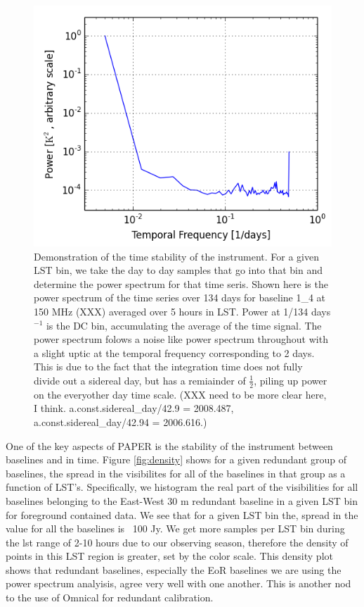 \documentclass[twocolumn,numberedappendix]{emulateapj} \shorttitle{PSA64}
\begin{document}
\begin{figure}[!t]
\centering
\includegraphics[width=\columnwidth]{plots/stability.png}
\caption{Demonstration of the time stability of the instrument. For a given LST
bin, we take the day to day samples that go into that bin and determine the
power spectrum for that time seris. Shown here is the power spectrum of the time
series over 134 days for baseline 1\_4 at 150 MHz (XXX) averaged over 5 hours in
LST. Power at 1/134 days$^{-1}$ is the DC bin, accumulating the average of the
time signal. The power spectrum folows a noise like power spectrum throughout
with a slight uptic at the temporal frequency corresponding to 2 days. This is
due to the fact that the integration time does not fully divide out a sidereal
day, but has a remiainder of $\frac{1}{2}$, piling up power on the everyother day
time scale. (XXX need to be more clear here, I think. a.const.sidereal\_day/42.9
= 2008.487, a.const.sidereal\_day/42.94 = 2006.616.)
}
\label{fig:stability}
\end{figure}


One of the key aspects of PAPER is the stability of the instrument between
baselines and in time. Figure \ref{fig:density} shows for a given redundant
group of baselines, the spread in the visibilites for all of the baselines in
that group as a function of LST's. Specifically, we histogram the real part of
the visibilities for all baselines belonging to the East-West 30 m redundant
baseline in a given LST bin for foreground contained data. We see that for a
given LST bin the, spread in the value for all the baselines is ~100 Jy.  We get
more samples per LST bin during the lst range of 2-10 hours due to our observing
season, therefore the density of points in this LST region is greater, set by
the color scale. This density plot shows that redundant baselines, especially
the EoR baselines we are using the power spectrum analyisis, agree very well
with one another. This is another nod to the use of Omnical for redundant
calibration. 
\end{document}
